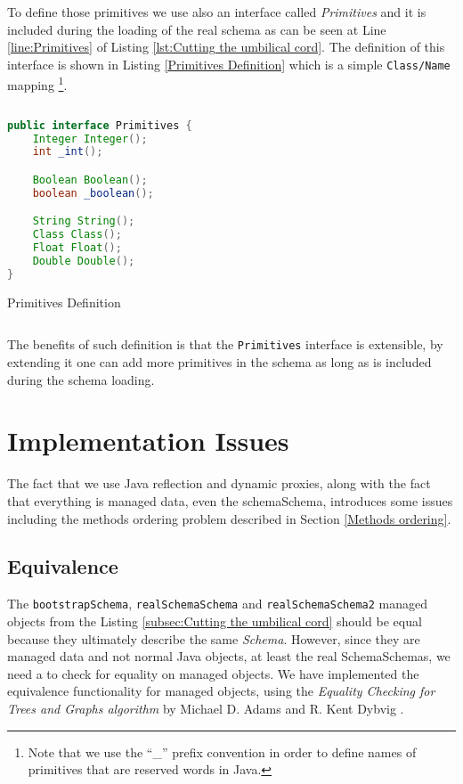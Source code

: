 To define those primitives we use also an interface called \textit{Primitives} and it is included during the loading of the real schema as can be seen at Line \ref{line:Primitives} of Listing \ref{lst:Cutting the umbilical cord}.
The definition of this interface is shown in Listing \ref{Primitives Definition} which is a simple \texttt{Class/Name} mapping \footnote{Note that we use the ``\_'' prefix convention in order to define names of primitives that are reserved words in Java.}. 

\begin{sourcecode} [H]
	\begin{lstlisting}[language=Java, escapechar=|]
public interface Primitives {
	Integer Integer();
	int _int();

	Boolean Boolean();
	boolean _boolean();

	String String();
	Class Class();
	Float Float();
	Double Double();
}
	\end{lstlisting}
	\caption{Primitives Definition}
	\label{lst:Primitives Definition}
\end{sourcecode}

The benefits of such definition is that the \texttt{Primitives} interface is extensible, by extending it one can add more primitives in the schema as long as is included during the schema loading.

\section{Implementation Issues}\label{Implementation Issues}
The fact that we use Java reflection and dynamic proxies, along with the fact that everything is managed data, even the schemaSchema, introduces some issues including the methods ordering problem described in Section \ref{Methods ordering}.

\subsection{Equivalence}\label{Managed Object equivalence}
The \texttt{bootstrapSchema}, \texttt{realSchemaSchema} and \texttt{realSchemaSchema2} managed objects from the Listing \ref{subsec:Cutting the umbilical cord} should be equal because they ultimately describe the same \textit{Schema}.
However, since they are managed data and not normal Java objects, at least the real SchemaSchemas, we need a to check for equality on managed objects.
We have implemented the equivalence functionality for managed objects, using the \textit{Equality Checking for Trees and Graphs
algorithm} by Michael D. Adams and R. Kent Dybvig \cite{adams2008efficient}.

